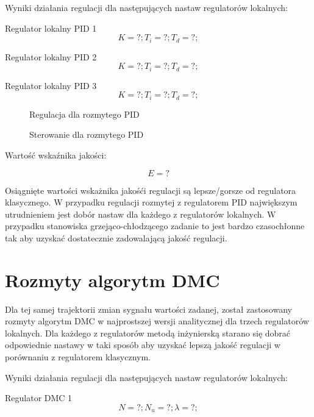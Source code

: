 Wyniki działania regulacji dla następujących nastaw regulatorów lokalnych:

Regulator lokalny PID 1
\begin{equation}
K = ?; 
T_i = ?; 
T_d = ?; 
\end{equation}

Regulator lokalny PID 2
\begin{equation}
K = ?; 
T_i = ?; 
T_d = ?; 
\end{equation}

Regulator lokalny PID 3
\begin{equation}
K = ?; 
T_i = ?; 
T_d = ?; 
\end{equation}

\begin{figure}[H]
\centering

\caption{Regulacja dla rozmytego PID}
\end{figure}

\begin{figure}[H]
\centering

\caption{Sterowanie dla rozmytego PID}
\end{figure}

Wartość wskaźnika jakości:

\begin{equation}
E = ?
\end{equation}

Osiągnięte wartości wskażnika jakośći regulacji są lepsze/gorsze od regulatora klasycznego. W przypadku regulacji rozmytej z regulatorem PID największym utrudnieniem jest 
dobór nastaw dla każdego z regulatorów lokalnych. W przypadku stanowiska grzejąco-chłodzącego zadanie to jest bardzo czasochłonne tak aby uzyskać dostatecznie zadowalającą jakość regulacji.

\section{Rozmyty algorytm DMC}

Dla tej samej trajektorii zmian sygnału wartości zadanej, został zastosowany rozmyty algorytm DMC w najprostszej wersji analitycznej dla trzech regulatorów lokalnych. Dla każdego z regulatorów metodą inżynierską starano się 
dobrać odpowiednie nastawy w taki sposób aby uzyskać lepszą jakość regulacji w porównaniu z regulatorem klasycznym.

Wyniki działania regulacji dla następujących nastaw regulatorów lokalnych:

Regulator DMC 1
\begin{equation}
N = ?; 
N_u = ?; 
\lambda = ?; 
\end{equation}

